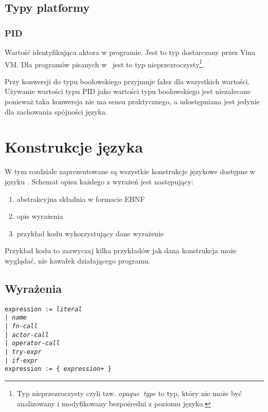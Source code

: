 \subsection{Typy platformy}

\subsubsection{PID}

Wartość identyfikująca aktora w programie.
Jest to typ dostarczany przez Viua VM. Dla programów pisanych w \ViuAct\ jest to
typ nieprzezroczysty\footnote{Typ nieprzezroczysty czyli tzw. \emph{opaque~type}
to typ, który nie może być analizowany i modyfikowany bezpośredni z poziomu
języka.}.

Przy konwersji do typu boolowskiego przyjmuje fałsz dla wszystkich wartości.
Używanie wartości typu PID jako wartości typu boolowskiego jest niezalecane
ponieważ taka konwersja nie ma sensu praktycznego, a udostępniana jest jedynie
dla zachowania spójności języka.

\section{Konstrukcje języka}

W tym rozdziale zaprezentowane są wszystkie konstrukcje językowe dostępne w języku \ViuAct.
Schemat opisu każdego z wyrażeń jest następujący:

\begin{enumerate}
    \item abstrakcyjna składnia w formacie EBNF
    \item opis wyrażenia
    \item przykład kodu wykorzystujący dane wyrażenie
\end{enumerate}

Przykład kodu to zazwyczaj kilka przykładów jak dana konstrukcja może wyglądać, nie kawałek działającego
programu.

\subsection{Wyrażenia}
\label{language_expressions}

\texttt{expression := \emph{literal} \\
\phantom{expression :}| \emph{name} \\
\phantom{expression :}| \emph{fn-call} \\
\phantom{expression :}| \emph{actor-call} \\
\phantom{expression :}| \emph{operator-call} \\
\phantom{expression :}| \emph{try-expr} \\
\phantom{expression :}| \emph{if-expr}}
\\
\texttt{expression := \{ \emph{expression}+ \}}
\vspace{1em}

